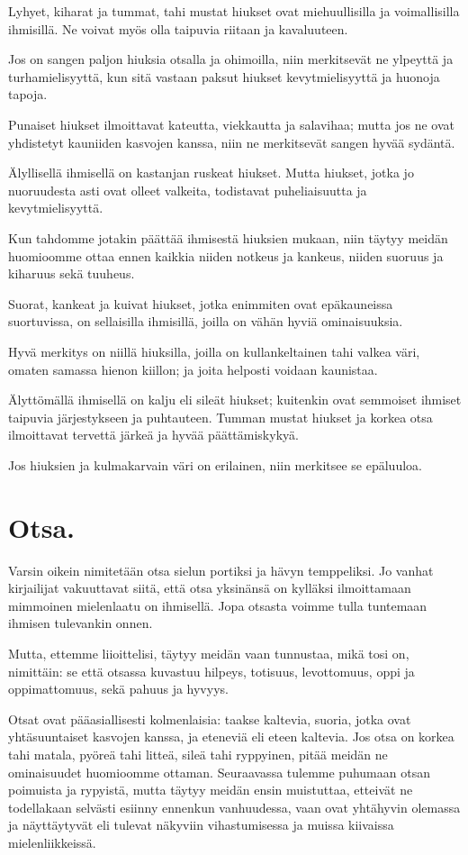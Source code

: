 \documentclass[11pt, twoside, finnish, a5paper]{book}
\begin{document}
Lyhyet, kiharat ja tummat, tahi mustat hiukset ovat
miehuullisilla ja voimallisilla ihmisillä. Ne voivat
myös olla taipuvia riitaan ja kavaluuteen.

Jos on sangen paljon hiuksia otsalla ja ohimoilla, niin
merkitsevät ne ylpeyttä ja turhamielisyyttä, kun sitä
vastaan paksut hiukset kevytmielisyyttä ja huonoja tapoja.

Punaiset hiukset ilmoittavat kateutta, viekkautta ja
salavihaa; mutta jos ne ovat yhdistetyt kauniiden kasvojen
kanssa, niin ne merkitsevät sangen hyvää sydäntä.

Älyllisellä ihmisellä on kastanjan ruskeat hiukset.
Mutta hiukset, jotka jo nuoruudesta asti ovat olleet
valkeita, todistavat puheliaisuutta ja kevytmielisyyttä.

Kun tahdomme jotakin päättää ihmisestä hiuksien
mukaan, niin täytyy meidän huomioomme ottaa ennen
kaikkia niiden notkeus ja kankeus, niiden suoruus ja
kiharuus sekä tuuheus.

Suorat, kankeat ja kuivat hiukset, jotka enimmiten
ovat epäkauneissa suortuvissa, on sellaisilla ihmisillä,
joilla on vähän hyviä ominaisuuksia.

Hyvä merkitys on niillä hiuksilla, joilla on
 kullankeltainen tahi valkea väri, omaten samassa hienon
kiillon; ja joita helposti voidaan kaunistaa.

Älyttömällä ihmisellä on kalju eli sileät hiukset;
kuitenkin ovat semmoiset ihmiset taipuvia järjestykseen
ja puhtauteen. Tumman mustat hiukset ja korkea otsa
ilmoittavat tervettä järkeä ja hyvää päättämiskykyä.

Jos hiuksien ja kulmakarvain väri on erilainen, niin
merkitsee se epäluuloa.

\chapter*{Otsa.}

Varsin oikein nimitetään otsa sielun portiksi ja hävyn
temppeliksi. Jo vanhat kirjailijat vakuuttavat siitä, että
otsa yksinänsä on kylläksi ilmoittamaan mimmoinen
mielenlaatu on ihmisellä. Jopa otsasta voimme tulla
tuntemaan ihmisen tulevankin onnen.

Mutta, ettemme liioittelisi, täytyy meidän vaan tunnustaa,
mikä tosi on, nimittäin: se että otsassa kuvastuu
hilpeys, totisuus, levottomuus, oppi ja oppimattomuus,
sekä pahuus ja hyvyys.

Otsat ovat pääasiallisesti kolmenlaisia: taakse kaltevia,
suoria, jotka ovat yhtäsuuntaiset kasvojen kanssa, ja
eteneviä eli eteen kaltevia. Jos otsa on korkea tahi
matala, pyöreä tahi litteä, sileä tahi ryppyinen, pitää
meidän ne ominaisuudet huomioomme ottaman.
Seuraavassa tulemme puhumaan otsan poimuista ja rypyistä,
mutta täytyy meidän ensin muistuttaa, etteivät ne
todellakaan selvästi esiinny ennenkun vanhuudessa, vaan ovat
yhtähyvin olemassa ja näyttäytyvät eli tulevat näkyviin
vihastumisessa ja muissa kiivaissa mielenliikkeissä.
\end{document}
